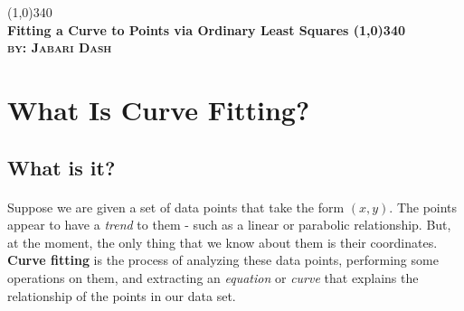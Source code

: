 \documentclass[12pt, letterpaper]{article}
\begin{document}
	
	\begin{titlepage}
		\begin{center}
			\line(1,0){340}\\
			[0.25in]
			\huge\bfseries Fitting a Curve to Points via Ordinary Least Squares
			\line(1,0){340}\\
			[1.1cm]
			\textsc{\Large by: Jabari Dash}\\
		\end{center}
	\end{titlepage}


	\tableofcontents
	

	\newpage
	
	\section{What Is Curve Fitting?} 
		\subsection{What is it?}
			\paragraph{}
				Suppose we are given a set of data points that take the form $(x, y)$. The points appear to have a \textit{trend} to them - such as a linear or parabolic relationship. But, at the moment, the only thing that we know about them is their coordinates. \textbf{Curve fitting} is the process of analyzing these data points, performing some operations on them, and extracting an \textit{equation} or \textit{curve} that explains the relationship of the points in our data set.	
				
\end{document}
